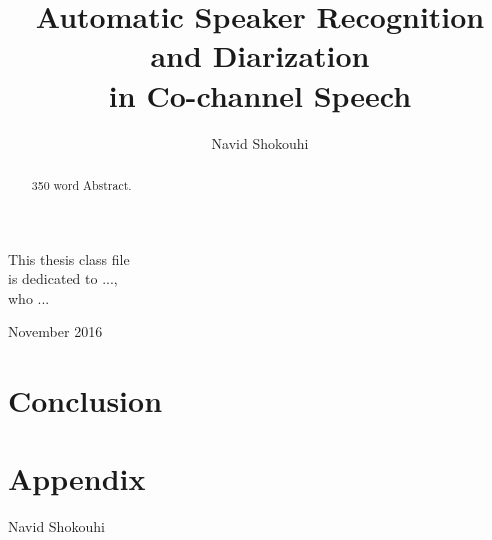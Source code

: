 \documentclass[doublespacing]{utdthesis}
\author{Navid Shokouhi}
\title{Automatic Speaker Recognition and Diarization \\
		in Co-channel Speech}
\begin{document}
\frontmatter

\signaturepage

\begin{dedication} %
This thesis class file \\
is dedicated to ..., \\
who ...
\end{dedication}

\maketitle

\begin{acks}{November 2016} %

\end{acks}

\begin{preface} %
\end{preface}

\begin{abstract}
350 word Abstract.

\end{abstract}

\tableofcontents
\listoffigures %
\listoftables %

\mainmatter











\chapter{Conclusion}
\label{c:conclude}



\chapter*{Appendix}
\label{a:other}

\begin{thesisbib}

\end{thesisbib}  %

\begin{vita}
Navid Shokouhi
\end{vita}
\end{document}
